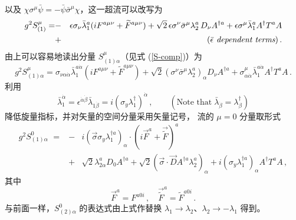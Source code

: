 以及 $\chi\sigma^\mu\bar\psi=-\bar\psi\bar\sigma^\mu\chi$，这一超流可以改写为
\begin{eqnarray}
g^2S^\mu_{(1)}=&-&\epsilon\sigma_\nu\bar{\lambda}^a_{1}(iF^{a\mu\nu}+ 
\widetilde F^{a\mu\nu})+\sqrt{2}\,\epsilon\sigma^\nu\bar{\sigma}^\mu
\lambda^a_{2}\,D_\nu A^{\dagger a}+\epsilon\sigma^\mu 
\bar{\lambda}^a_{1} A^\dagger T^a A \nonumber \\
&+& (\mbox{\it $\bar\epsilon$ dependent terms})\,.\nonumber
\end{eqnarray}
由上可以容易地读出分量
$S^\mu_{(1)\alpha}$（见式 (\ref{S-comp})）为
$$
g^2 S^\mu_{(1)\alpha}= \sigma_{\nu\alpha\dot\alpha}
\bar{\lambda}^{a\dot\alpha}_{1} (iF^{a\mu\nu}+\widetilde F^{a\mu\nu})
+\sqrt{2}(\sigma^\nu\bar{\sigma}^\mu\lambda^a_{2})_\alpha D_\nu 
A^{\dagger a}+\sigma^\mu_{\alpha\dot{\alpha}}
\bar{\lambda}^{a\dot{\alpha}}_{1} A^\dagger T^a A\,. 
$$
利用
$$
\bar{\lambda}^{\dot{\alpha}}_{1}=\epsilon^{\dot{\alpha}\dot{\beta}}
\bar\lambda_{1\dot\beta}=i(\sigma_y\lambda^\dagger_1)^{\dot\alpha}\,,
\qquad(\mbox{Note that}\;\bar\lambda_{\dot\beta}=\lambda^\dagger_\beta) 
$$
降低旋量指标，并对矢量的空间分量采用矢量记号，
流的 $\mu=0$ 分量取形式
\begin{eqnarray}
g^2S^0_{(1)\alpha}\,\,=&-&i(\vec{\sigma}\sigma_y\lambda^{\dagger a}_1)_\alpha
\cdot (i\vec{F}^a+\vec{\widetilde F})^a \nonumber\\
&+& \sqrt{2} \lambda^a_{2\alpha} D_0 A^{\dagger a} +
\sqrt{2}(\vec{\sigma}\cdot\vec{D}A^{\dagger a}\lambda^a_{2})_\alpha 
+i(\sigma_y\lambda^{\dagger a}_1)_\alpha A^\dagger T^a A\,, \nonumber
\end{eqnarray}
其中
$$
\vec{F}^a=F^{a 0i}\,,\quad \vec{\widetilde F}^a=\widetilde F^{a0i}\,.
$$
与前面一样，$S^0_{(2)\alpha}$ 的表达式由上式作替换
$\lambda_1\rightarrow\lambda_2$、$\lambda_2\rightarrow-\lambda_1$ 得到。

